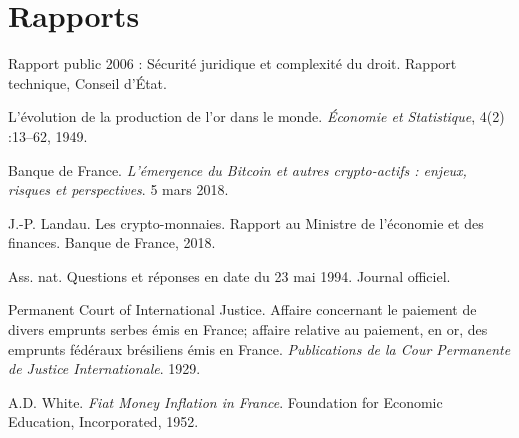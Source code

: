 {\section*{Rapports}
Rapport public 2006 : Sécurité juridique et complexité du droit. Rapport technique, Conseil d'État.\par
L'évolution de la production de l'or dans le monde. \emph{Économie et Statistique}, 4(2) :13–62, 1949.\par
Banque de France. \emph{L'émergence du Bitcoin et autres crypto-actifs : enjeux, risques et perspectives}. 5 mars 2018.\par
J.-P. Landau. Les crypto-monnaies. Rapport au Ministre de l'économie et des finances. Banque de France, 2018.\par
Ass. nat. Questions et réponses en date du 23 mai 1994. Journal officiel.\par
Permanent Court of International Justice. Affaire concernant le paiement de divers emprunts serbes émis en France; affaire relative au paiement, en or, des emprunts fédéraux brésiliens émis en France. \emph{Publications de la Cour Permanente de Justice Internationale}. 1929.\par
A.D. White. \emph{Fiat Money Inflation in France}. Foundation for Economic Education, Incorporated, 1952.

}
